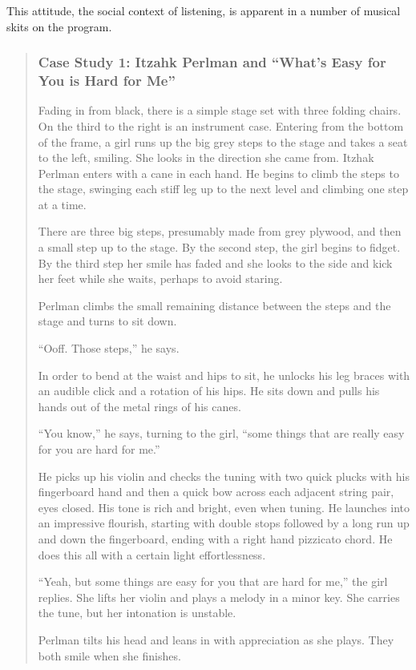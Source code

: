 \documentclass[12pt,letterpaper]{article}
\begin{document}
	This attitude, the social context of listening, is apparent in a number 
	of musical skits on the program.  


	\begin{quote}
	\subsubsection*{Case Study 1: Itzahk Perlman and ``What's Easy for You
	 is Hard for Me''}

	Fading in from black, there is a simple stage set with three folding 
	chairs. On the third to the right is an instrument case. Entering from 
	the bottom of the frame, a girl runs up the big grey steps to the stage 
	and takes a seat to the left, smiling. She looks in the direction she 
	came from. Itzhak Perlman enters with a cane in each hand. He begins 
	to climb the steps to the stage, swinging each stiff leg up to the next
	level and climbing one step at a time. 

	There are three big steps, presumably made from grey plywood, and then a
	small step up to the stage. By the second step, the girl begins to 
	fidget. By the third step her smile has faded and she looks to the side
	and kick her feet while she waits, perhaps to avoid staring.   

	Perlman climbs the small remaining distance between the steps and the 
	stage and turns to sit down. 

	``Ooff. Those steps,'' he says.

	In order to bend at the waist and hips to sit, he unlocks his leg 
	braces with an audible click and a rotation of his hips. He sits down 
	and pulls his hands out of the metal rings of his canes.

	``You know,'' he says, turning to the girl, ``some things that are 
	really easy for you are hard for me.''

	He picks up his violin and checks the tuning with two quick plucks with 
	his fingerboard hand and then a quick bow across each adjacent string
	pair, eyes closed. His tone is rich and bright, even when tuning. He 
	launches into an impressive flourish, starting with double stops 
	followed by a long run up and down the fingerboard, ending with a right
	hand pizzicato chord. He does this all with a certain light 
	effortlessness.

	``Yeah, but some things are easy for you that are hard for me,'' the 
	girl replies. She lifts her violin and plays a melody in a minor key.
	She 
	carries the tune, but her intonation is unstable. 

	Perlman tilts his head and leans in with appreciation as she plays.
	They both smile when she finishes.   

	\end{quote}
\end{document}
